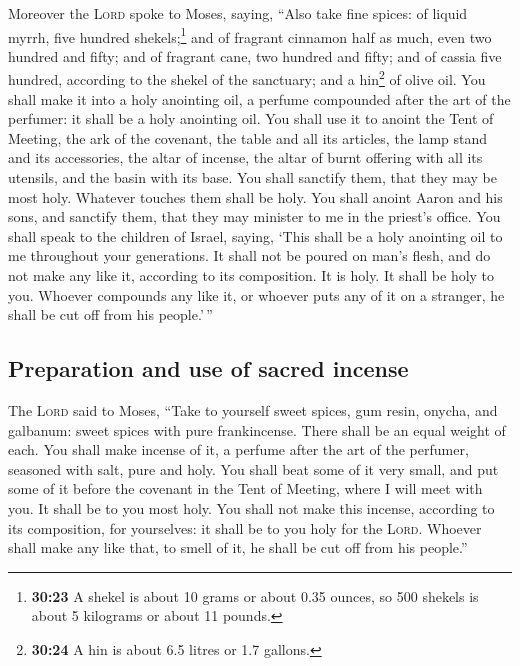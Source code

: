  Moreover the \textsc{Lord} spoke to Moses, saying,
 ``Also take fine spices: of liquid myrrh, five hundred
shekels;\footnote{\textbf{30:23} A shekel is about 10 grams or about
  0.35 ounces, so 500 shekels is about 5 kilograms or about 11 pounds.}
and of fragrant cinnamon half as much, even two hundred and fifty; and
of fragrant cane, two hundred and fifty;  and of cassia
five hundred, according to the shekel of the sanctuary; and a
hin\footnote{\textbf{30:24} A hin is about 6.5 litres or 1.7 gallons.}
of olive oil.  You shall make it into a holy anointing
oil, a perfume compounded after the art of the perfumer: it shall be a
holy anointing oil.  You shall use it to anoint the Tent
of Meeting, the ark of the covenant,  the table and all
its articles, the lamp stand and its accessories, the altar of incense,
 the altar of burnt offering with all its utensils, and
the basin with its base.  You shall sanctify them, that
they may be most holy. Whatever touches them shall be holy.
 You shall anoint Aaron and his sons, and sanctify them,
that they may minister to me in the priest's office.  You
shall speak to the children of Israel, saying, `This shall be a holy
anointing oil to me throughout your generations.  It
shall not be poured on man's flesh, and do not make any like it,
according to its composition. It is holy. It shall be holy to you.
 Whoever compounds any like it, or whoever puts any of it
on a stranger, he shall be cut off from his people.'\,''

\hypertarget{preparation-and-use-of-sacred-incense}{%
\subsection{Preparation and use of sacred
incense}\label{preparation-and-use-of-sacred-incense}}

 The \textsc{Lord} said to Moses, ``Take to yourself
sweet spices, gum resin, onycha, and galbanum: sweet spices with pure
frankincense. There shall be an equal weight of each. 
You shall make incense of it, a perfume after the art of the perfumer,
seasoned with salt, pure and holy.  You shall beat some
of it very small, and put some of it before the covenant in the Tent of
Meeting, where I will meet with you. It shall be to you most holy.
 You shall not make this incense, according to its
composition, for yourselves: it shall be to you holy for the
\textsc{Lord}.  Whoever shall make any like that, to
smell of it, he shall be cut off from his people.''

